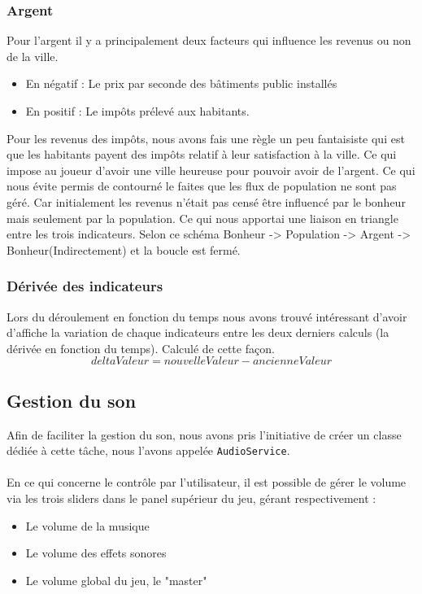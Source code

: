\documentclass[a4paper,10pt,openany,oneside]{report}
\begin{document}
\subsubsection{Argent}
Pour l'argent il y a principalement deux facteurs qui influence les revenus ou non de la ville.
\begin{itemize}
	\item En négatif : Le prix par seconde des bâtiments public installés
	\item En positif : Le impôts prélevé aux habitants.
\end{itemize}
Pour les revenus des impôts, nous avons fais une règle un peu fantaisiste qui est que les habitants payent des impôts relatif à leur satisfaction à la ville. Ce qui impose au joueur d'avoir une ville heureuse pour pouvoir avoir de l'argent. Ce qui nous évite permis de contourné le faites que les flux de population ne sont pas géré. Car initialement les revenus n'était pas censé être influencé par le bonheur mais seulement par la population. Ce qui nous apportai une liaison en triangle entre les trois indicateurs.
Selon ce schéma Bonheur -> Population -> Argent -> Bonheur(Indirectement) et la boucle est fermé.

\subsubsection{Dérivée des indicateurs}
Lors du déroulement en fonction du temps nous avons trouvé intéressant d'avoir d'affiche la variation de chaque indicateurs entre les deux derniers calculs (la dérivée en fonction du temps). Calculé de cette façon. \[deltaValeur = nouvelleValeur - ancienneValeur\]

\subsection{Gestion du son}
Afin de faciliter la gestion du son, nous avons pris l'initiative de créer un classe dédiée à cette tâche, nous l'avons appelée \texttt{AudioService}.
\paragraph{}
En ce qui concerne le contrôle par l'utilisateur, il est possible de gérer le volume via les trois sliders dans le panel supérieur du jeu, gérant respectivement :
\begin{itemize}
\item Le volume de la musique
\item Le volume des effets sonores
\item Le volume global du jeu, le "master"
\end{itemize}
\end{document}
